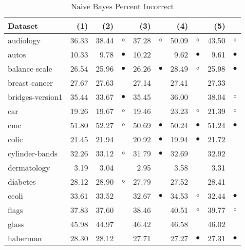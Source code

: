 \begin{table}[htb]
\caption{\label{nbpi}Naive Bayes Percent Incorrect}
\footnotesize
{\centering \begin{tabular}{lrr@{\hspace{0.1cm}}cr@{\hspace{0.1cm}}cr@{\hspace{0.1cm}}cr@{\hspace{0.1cm}}c}
\\
\hline
Dataset & (1)& (2) & & (3) & & (4) & & (5) & \\
\hline
audiology & 36.33 & 38.44 &   $\circ$ & 37.28 &   $\circ$ & 50.09 &    $\circ$ & 43.50 &    $\circ$\\
autos & 10.33 &  9.78 & $\bullet$ & 10.22 &           &  9.62 &  $\bullet$ &  9.61 &  $\bullet$\\
balance-scale & 26.54 & 25.96 & $\bullet$ & 26.26 & $\bullet$ & 28.49 &    $\circ$ & 25.98 &  $\bullet$\\
breast-cancer & 27.67 & 27.63 &           & 27.14 &           & 27.41 &            & 27.33 &           \\
bridges-version1 & 35.44 & 33.67 & $\bullet$ & 35.45 &           & 36.00 &            & 38.04 &    $\circ$\\
car & 19.26 & 19.67 &   $\circ$ & 19.46 &           & 23.23 &    $\circ$ & 21.39 &    $\circ$\\
cmc & 51.80 & 52.27 &   $\circ$ & 50.69 & $\bullet$ & 50.24 &  $\bullet$ & 51.24 &  $\bullet$\\
colic & 21.45 & 21.94 &           & 20.92 & $\bullet$ & 19.94 &  $\bullet$ & 21.72 &           \\
cylinder-bands & 32.26 & 33.12 &   $\circ$ & 31.79 & $\bullet$ & 32.69 &            & 32.92 &           \\
dermatology &  3.19 &  3.04 &           &  2.95 &           &  3.58 &            &  3.31 &           \\
diabetes & 28.12 & 28.90 &   $\circ$ & 27.79 &           & 27.52 &            & 28.41 &           \\
ecoli & 33.61 & 33.52 &           & 32.67 & $\bullet$ & 34.53 &    $\circ$ & 32.44 &  $\bullet$\\
flags & 37.83 & 37.60 &           & 38.46 &           & 40.51 &    $\circ$ & 39.77 &    $\circ$\\
glass & 45.98 & 44.97 &           & 46.42 &           & 46.58 &            & 46.02 &           \\
haberman & 28.30 & 28.12 &           & 27.71 &           & 27.27 &  $\bullet$ & 27.31 &  $\bullet$\\

\end{tabular}}
\end{table}
